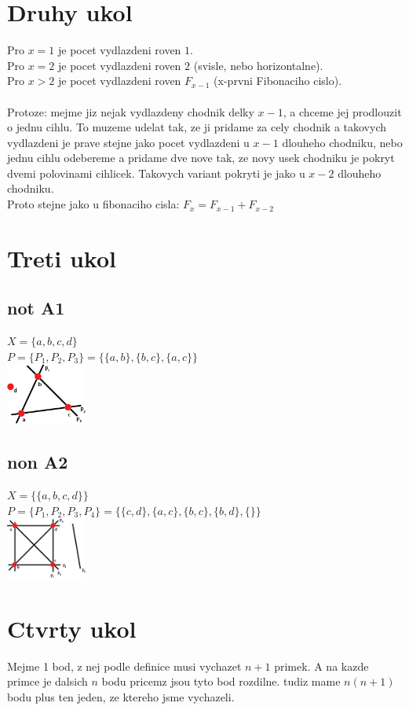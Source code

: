\documentclass[a4paper]{article}
\begin{document}
\section*{Druhy ukol}
Pro $x = 1$ je pocet vydlazdeni roven $1$.\\
Pro $x = 2$ je pocet vydlazdeni roven $2$ (svisle, nebo horizontalne).\\
Pro $x > 2$ je pocet vydlazdeni roven $F_{x-1}$ (x-prvni Fibonaciho cislo).\\\\
Protoze: mejme jiz nejak vydlazdeny chodnik delky $x-1$, a chceme jej prodlouzit
o jednu cihlu. To muzeme udelat tak, ze ji pridame za cely chodnik a
takovych vydlazdeni je prave stejne jako pocet vydlazdeni u $x-1$ dlouheho chodniku,
nebo jednu cihlu odebereme a pridame dve nove tak,
ze novy usek chodniku je pokryt dvemi polovinami cihlicek.
Takovych variant pokryti je jako u $x-2$ dlouheho chodniku.\\
Proto stejne jako u fibonaciho cisla: $F_x = F_{x-1} + F_{x-2}$

\section*{Treti ukol}
\subsection*{not A1}
$X = \{a,b,c,d\}$\\
$P = \{P_1, P_2, P_3\} = \{\{a,b\},\{b,c\},\{a,c\}\}$\\
\includegraphics[width=100px]{hw2-1.png}

\subsection*{non A2}
$X = \{\{a,b,c,d\}\}$\\
$P = \{P_1, P_2, P_3, P_4\} = \{\{c,d\},\{a,c\},\{b,c\},\{b,d\},\{\}\}$\\
\includegraphics[width=100px]{hw2-2.png}


\section*{Ctvrty ukol}
Mejme 1 bod, z nej podle definice musi vychazet $n+1$ primek.
A na kazde primce je dalsich $n$ bodu pricemz jsou tyto bod rozdilne.
tudiz mame $n(n+1)$ bodu plus ten jeden, ze ktereho jsme vychazeli.
\end{document}

